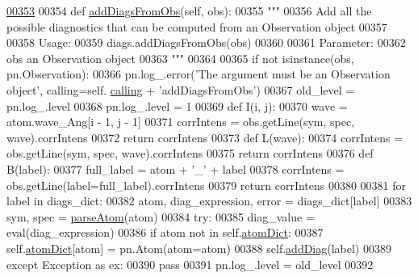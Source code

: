 \begin{DoxyCode}
\hypertarget{classpyneb_1_1core_1_1diags_1_1_diagnostics_l00353}{}\hyperlink{classpyneb_1_1core_1_1diags_1_1_diagnostics_ab6641fba2aa36c483b751dd1b9621734}{00353} 
00354     \textcolor{keyword}{def }\hyperlink{classpyneb_1_1core_1_1diags_1_1_diagnostics_ab6641fba2aa36c483b751dd1b9621734}{addDiagsFromObs}(self, obs):
00355         \textcolor{stringliteral}{"""}
00356 \textcolor{stringliteral}{        Add all the possible diagnostics that can be computed from an Observation object}
00357 \textcolor{stringliteral}{        }
00358 \textcolor{stringliteral}{        Usage:}
00359 \textcolor{stringliteral}{            diags.addDiagsFromObs(obs)}
00360 \textcolor{stringliteral}{            }
00361 \textcolor{stringliteral}{        Parameter:}
00362 \textcolor{stringliteral}{            obs     an Observation object}
00363 \textcolor{stringliteral}{        """}
00364         
00365         \textcolor{keywordflow}{if} \textcolor{keywordflow}{not} isinstance(obs, pn.Observation):
00366             pn.log\_.error(\textcolor{stringliteral}{'The argument must be an Observation object'}, calling=self.
      \hyperlink{classpyneb_1_1core_1_1diags_1_1_diagnostics_a07dce673fec8b2383ef411ab94b0b2fe}{calling} + \textcolor{stringliteral}{'addDiagsFromObs'})
00367         old\_level = pn.log\_.level
00368         pn.log\_.level = 1
00369         \textcolor{keyword}{def }I(i, j):
00370             wave = atom.wave\_Ang[i - 1, j - 1]
00371             corrIntens = obs.getLine(sym, spec, wave).corrIntens
00372             \textcolor{keywordflow}{return} corrIntens
00373         \textcolor{keyword}{def }L(wave):
00374             corrIntens = obs.getLine(sym, spec, wave).corrIntens
00375             \textcolor{keywordflow}{return} corrIntens
00376         \textcolor{keyword}{def }B(label):
00377             full\_label = atom + \textcolor{stringliteral}{'\_'} + label
00378             corrIntens = obs.getLine(label=full\_label).corrIntens
00379             \textcolor{keywordflow}{return} corrIntens
00380         
00381         \textcolor{keywordflow}{for} label \textcolor{keywordflow}{in} diags\_dict:
00382             atom, diag\_expression, error = diags\_dict[label]
00383             sym, spec = \hyperlink{namespacepyneb_1_1utils_1_1misc_a2bb6f906a75f26a882093e9ce9272507}{parseAtom}(atom)
00384             \textcolor{keywordflow}{try}:
00385                 diag\_value = eval(diag\_expression)
00386                 \textcolor{keywordflow}{if} atom \textcolor{keywordflow}{not} \textcolor{keywordflow}{in} self.\hyperlink{classpyneb_1_1core_1_1diags_1_1_diagnostics_a36301f268745b33abe6cfeb3e41a6356}{atomDict}:
00387                     self.\hyperlink{classpyneb_1_1core_1_1diags_1_1_diagnostics_a36301f268745b33abe6cfeb3e41a6356}{atomDict}[atom] = pn.Atom(atom=atom)
00388                 self.\hyperlink{classpyneb_1_1core_1_1diags_1_1_diagnostics_a508fa9c5a2216f9eb4128338c33a6f75}{addDiag}(label)
00389             \textcolor{keywordflow}{except} Exception \textcolor{keyword}{as} ex:
00390                 \textcolor{keywordflow}{pass}
00391         pn.log\_.level = old\_level
00392     
    
\end{DoxyCode}
